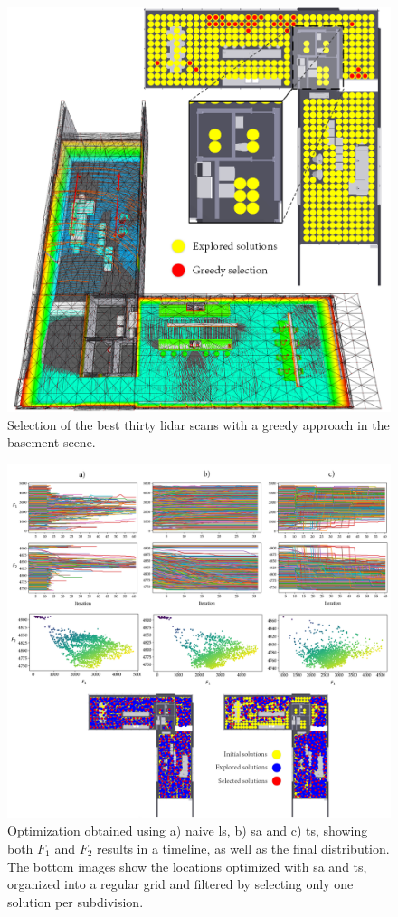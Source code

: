 \begin{figure}
    \centering
    \includegraphics[width=.8\linewidth]{figs/lidar_optimization/greedy_results.png}
	\caption{Selection of the best thirty \acrshort{lidar} scans with a greedy approach in the basement scene.}
	\label{fig:greedy_results}
\end{figure}

\begin{figure}
    \centering
    \includegraphics[width=.9\linewidth]{figs/lidar_optimization/local_search_results.png}
	\caption{Optimization obtained using a) naive \acrshort{ls}, b) \acrshort{sa} and c) \acrshort{ts}, showing both $F_1$ and $F_2$ results in a timeline, as well as the final distribution. The bottom images show the locations optimized with \acrshort{sa} and \acrshort{ts}, organized into a regular grid and filtered by selecting only one solution per subdivision.}
	\label{fig:local_search_results}
\end{figure}

